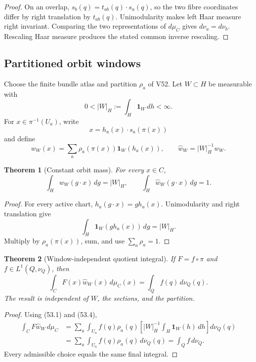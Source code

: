 \documentclass[11pt]{article}
\newtheorem{theorem}{Theorem}[section]
\begin{document}
\begin{proof}
On an overlap, \(s_b(q)=t_{ab}(q)\cdot s_a(q)\), so the two fibre
coordinates differ by right translation by \(t_{ab}(q)\).
Unimodularity makes left Haar measure right invariant.  Comparing the
two representations of \(d\mu_C\) gives \(d\nu_a=d\nu_b\).
Rescaling Haar measure produces the stated common inverse rescaling.
\end{proof}

\subsection{Partitioned orbit windows}

Choose the finite bundle atlas and partition \(\rho_a\) of V52.  Let
\(W\subset H\) be measurable with
\[
                         0<|W|_H:=\int_H\mathbf1_W\,dh<\infty. \tag{53.2}
\]
For \(x\in\pi^{-1}(U_a)\), write
\[
                         x=h_a(x)\cdot s_a(\pi(x))             \tag{53.3}
\]
and define
\[
 w_W(x)=\sum_a\rho_a(\pi(x))\mathbf1_W(h_a(x)),\qquad
 \widehat w_W=|W|_H^{-1}w_W.                                 \tag{53.4}
\]

\begin{theorem}[Constant orbit mass]
\label{thm:v11v53-orbit-mass}
For every \(x\in C\),
\[
 \int_Hw_W(g\cdot x)\,dg=|W|_H,\qquad
 \int_H\widehat w_W(g\cdot x)\,dg=1.                         \tag{53.5}
\]
\end{theorem}

\begin{proof}
For every active chart,
\(h_a(g\cdot x)=g h_a(x)\).  Unimodularity and right translation give
\[
 \int_H\mathbf1_W(g h_a(x))\,dg=|W|_H.
\]
Multiply by \(\rho_a(\pi(x))\), sum, and use
\(\sum_a\rho_a=1\).
\end{proof}

\begin{theorem}[Window-independent quotient integral]
\label{thm:v11v53-window}
If \(F=f\circ\pi\) and \(f\in L^1(Q,\nu_Q)\), then
\[
 \boxed{\int_CF(x)\widehat w_W(x)\,d\mu_C(x)
                       =\int_Qf(q)\,d\nu_Q(q).}               \tag{53.6}
\]
The result is independent of \(W\), the sections, and the partition.
\end{theorem}

\begin{proof}
Using (53.1) and (53.4),
\[
\begin{split}
 \int_CF\widehat w_W\,d\mu_C
 &=\sum_a\int_{U_a}f(q)\rho_a(q)
   \left[|W|_H^{-1}\int_H\mathbf1_W(h)\,dh\right]d\nu_Q(q)\\
 &=\sum_a\int_{U_a}f(q)\rho_a(q)\,d\nu_Q(q)
 =\int_Qf\,d\nu_Q.
\end{split}                                                    \tag{53.7}
\]
Every admissible choice equals the same final integral.
\end{proof}
\end{document}

